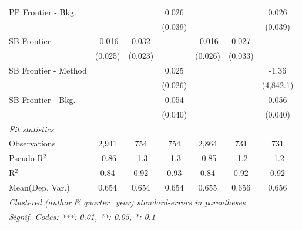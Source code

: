 \begin{tabular}{lcccccc}
   PP Frontier - Bkg.   &                &         & 0.026        &               &             & 0.026\\   
                        &                &         & (0.039)      &               &             & (0.039)\\   
   SB Frontier          & -0.016         & 0.032   &              & -0.016        & 0.027       &   \\   
                        & (0.025)        & (0.023) &              & (0.026)       & (0.033)     &   \\   
   SB Frontier - Method &                &         & 0.025        &               &             & -1.36\\   
                        &                &         & (0.026)      &               &             & (4,842.1)\\   
   SB Frontier - Bkg.   &                &         & 0.054        &               &             & 0.056\\   
                        &                &         & (0.040)      &               &             & (0.040)\\   
   \midrule
   \emph{Fit statistics}\\
   Observations         & 2,941          & 754     & 754          & 2,864         & 731         & 731\\  
   Pseudo R$^2$         & -0.86          & -1.3    & -1.3         & -0.85         & -1.2        & -1.2\\  
   R$^2$                & 0.84           & 0.92    & 0.93         & 0.84          & 0.92        & 0.92\\  
Mean(Dep. Var.) & 0.654 & 0.654 & 0.654 & 0.655 & 0.656 & 0.656 \\
   \midrule \midrule
   \multicolumn{7}{l}{\emph{Clustered (author \& quarter\_year) standard-errors in parentheses}}\\
   \multicolumn{7}{l}{\emph{Signif. Codes: ***: 0.01, **: 0.05, *: 0.1}}\\
\end{tabular}
\par\endgroup
